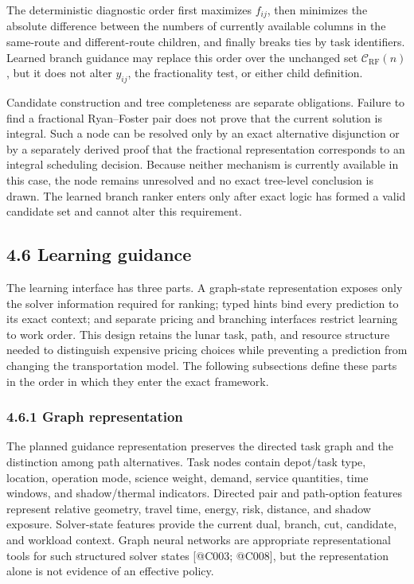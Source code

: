 \documentclass[
  11pt,
]{article}
\begin{document}
The deterministic diagnostic order first maximizes \(f_{ij}\), then
minimizes the absolute difference between the numbers of currently
available columns in the same-route and different-route children, and
finally breaks ties by task identifiers. Learned branch guidance may
replace this order over the unchanged set
\(\mathcal{C}_{\mathrm{RF}}(n)\), but it does not alter \(y_{ij}\), the
fractionality test, or either child definition.

Candidate construction and tree completeness are separate obligations.
Failure to find a fractional Ryan--Foster pair does not prove that the
current solution is integral. Such a node can be resolved only by an
exact alternative disjunction or by a separately derived proof that the
fractional representation corresponds to an integral scheduling
decision. Because neither mechanism is currently available in this case,
the node remains unresolved and no exact tree-level conclusion is drawn.
The learned branch ranker enters only after exact logic has formed a
valid candidate set and cannot alter this requirement.

\hypertarget{learning-guidance}{%
\subsection{4.6 Learning guidance}\label{learning-guidance}}

The learning interface has three parts. A graph-state representation
exposes only the solver information required for ranking; typed hints
bind every prediction to its exact context; and separate pricing and
branching interfaces restrict learning to work order. This design
retains the lunar task, path, and resource structure needed to
distinguish expensive pricing choices while preventing a prediction from
changing the transportation model. The following subsections define
these parts in the order in which they enter the exact framework.

\hypertarget{graph-representation}{%
\subsubsection{4.6.1 Graph representation}\label{graph-representation}}

The planned guidance representation preserves the directed task graph
and the distinction among path alternatives. Task nodes contain
depot/task type, location, operation mode, science weight, demand,
service quantities, time windows, and shadow/thermal indicators.
Directed pair and path-option features represent relative geometry,
travel time, energy, risk, distance, and shadow exposure. Solver-state
features provide the current dual, branch, cut, candidate, and workload
context. Graph neural networks are appropriate representational tools
for such structured solver states {[}@C003; @C008{]}, but the
representation alone is not evidence of an effective policy.
\end{document}
